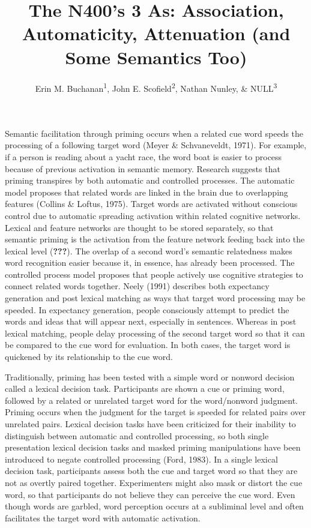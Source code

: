\documentclass[english,man]{apa6}
\title{The N400's 3 As: Association, Automaticity, Attenuation (and Some
Semantics Too)}
\author{Erin M. Buchanan\textsuperscript{1}, John E. Scofield\textsuperscript{2}, Nathan Nunley, \& NULL\textsuperscript{3}}
\affiliation{
    \vspace{0.5cm}
          \textsuperscript{1} Missouri State University\\
          \textsuperscript{2} University of Missouri\\
          \textsuperscript{3} University of Mississippi  }
\theoremstyle{definition}
\theoremstyle{definition}
\theoremstyle{definition}
\theoremstyle{remark}
\begin{document}
\maketitle

\setcounter{secnumdepth}{0}



Semantic facilitation through priming occurs when a related cue word
speeds the processing of a following target word (Meyer \& Schvaneveldt,
1971). For example, if a person is reading about a yacht race, the word
boat is easier to process because of previous activation in semantic
memory. Research suggests that priming transpires by both automatic and
controlled processes. The automatic model proposes that related words
are linked in the brain due to overlapping features (Collins \& Loftus,
1975). Target words are activated without conscious control due to
automatic spreading activation within related cognitive networks.
Lexical and feature networks are thought to be stored separately, so
that semantic priming is the activation from the feature network feeding
back into the lexical level ({\textbf{???}}). The overlap of a second
word's semantic relatedness makes word recognition easier because it, in
essence, has already been processed. The controlled process model
proposes that people actively use cognitive strategies to connect
related words together. Neely (1991) describes both expectancy
generation and post lexical matching as ways that target word processing
may be speeded. In expectancy generation, people consciously attempt to
predict the words and ideas that will appear next, especially in
sentences. Whereas in post lexical matching, people delay processing of
the second target word so that it can be compared to the cue word for
evaluation. In both cases, the target word is quickened by its
relationship to the cue word.

Traditionally, priming has been tested with a simple word or nonword
decision called a lexical decision task. Participants are shown a cue or
priming word, followed by a related or unrelated target word for the
word/nonword judgment. Priming occurs when the judgment for the target
is speeded for related pairs over unrelated pairs. Lexical decision
tasks have been criticized for their inability to distinguish between
automatic and controlled processing, so both single presentation lexical
decision tasks and masked priming manipulations have been introduced to
negate controlled processing (Ford, 1983). In a single lexical decision
task, participants assess both the cue and target word so that they are
not as overtly paired together. Experimenters might also mask or distort
the cue word, so that participants do not believe they can perceive the
cue word. Even though words are garbled, word perception occurs at a
subliminal level and often facilitates the target word with automatic
activation.
\end{document}
